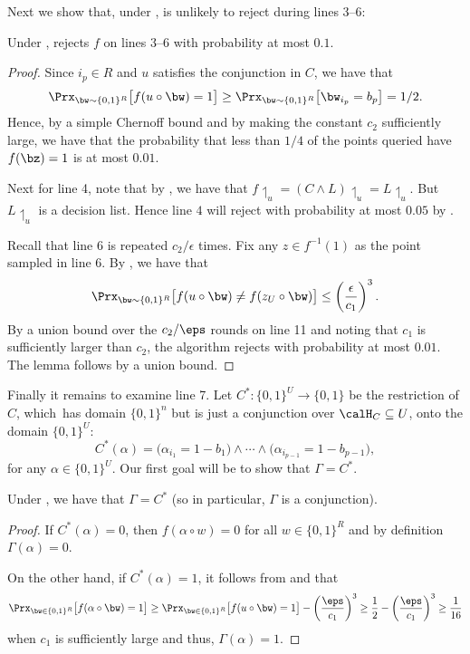 \documentclass[11pt]{article}
\theoremstyle{definition}
\begin{document}
Next we show that, under ,  is unlikely to reject during lines 3--6:

\begin{lemma}\label{lem: f is DL 6-7}
Under ,  rejects $f$ on lines 3--6 with probability at most $0.1$.
\end{lemma}
\begin{proof}
    Since $i_p \in R$ and $ u$ satisfies the conjunction in $C$, we have that $$\Prx_{\bw \sim \{0,1\}^R}\big[f(u\circ \bw)=1\big] \geq \Prx_{\bw \sim \{0,1\}^R}\big[{\bw_{i_p}=b_p} \big] = 1/2.$$
    Hence, by a simple Chernoff bound and by making the constant $c_2$ sufficiently large, we have that the probability that less than $1/4$ of the points queried have $f(\bz)=1$ is at most $0.01$.

Next for line 4, note that by , we have that $f{\upharpoonleft_{u}}=(C\land L){\upharpoonleft_{u}}=L{\upharpoonleft_{u}}$. But $L{\upharpoonleft_{u}}$ is a decision list. Hence line $4$ will reject with probability at most $0.05$ by  .

   Recall that line $6$ is repeated $c_2/\epsilon$ times.
   Fix any $z \in f^{-1}(1)$ as the point sampled in line ${6}$.  By , we have that 
    \begin{align*}
    \Prx_{\bw \sim \{0,1\}^{R}}\big[f(u \circ \bw) \neq f(z_{U} \circ \bw)\big] \leq \left(\frac{\epsilon}{ c_1}\right)^3.
\end{align*}
By a union bound over the $c_2/\eps$ rounds on line 11 and noting
  that $c_1$ is sufficiently larger than $c_2$,
  the algorithm rejects with probability at most $0.01$.
The lemma follows by a union bound.
\end{proof}

Finally it remains to examine line 7. 
Let $C^*:\{0,1\}^U\rightarrow \{0,1\}$ be the restriction of $C$, which~has domain $\{0,1\}^n$ but is just a conjunction over $\calH_C\subseteq U$, onto the domain $\{0,1\}^U$:
$$
C^*(\alpha)=\big(\alpha_{i_1}=1-b_1\big)\land \cdots \land \big(\alpha_{i_{p-1}}=1-b_{p-1}\big),
$$
{for any $\alpha\in \{0,1\}^U$.}
Our first goal will be to show that $\Gamma=C^*$. 

\begin{lemma}\label{thm: gamma=C}
Under , we have that  $\Gamma=C^*$ (so in particular, $\Gamma$ is a conjunction).
\end{lemma}
\begin{proof}
If $C^*(\alpha)=0$, then  
  $f(\alpha\circ w)=0$ for all $w\in \{0,1\}^R$ and by definition  $\Gamma(\alpha)=0$.

On the other hand, if $C^*(\alpha)=1$, it follows from
   and  that 
$$
\Prx_{\bw\in \{0,1\}^R}
\big[f(\alpha\circ \bw)=1\big]\ge 
\Prx_{\bw\in \{0,1\}^R}
\big[f(u\circ \bw)=1\big]-\left(\frac{\eps}{c_1}\right)^3
\ge \frac{1}{2}-\left(\frac{\eps}{c_1}\right)^3\ge \frac{1}{16}
$$
when $c_1$ is sufficiently large and thus, $\Gamma(\alpha)=1$.
\end{proof}
\end{document}
